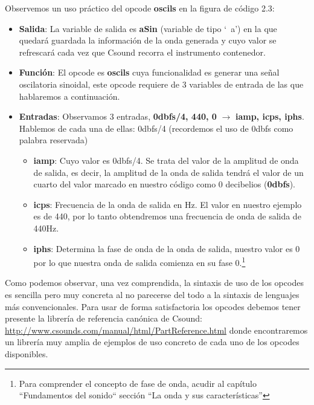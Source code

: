 
Observemos un uso práctico del opcode \textbf{oscils} en la figura de código 2.3:

\begin{itemize}
 \item \textbf{Salida}: La variable de salida es \textbf{aSin} (variable de tipo `\ a') en la que quedará guardada la información de la onda generada y cuyo valor se refrescará cada vez que Csound recorra el instrumento contenedor.
 
 \item \textbf{Función}: El opcode es \textbf{oscils} cuya funcionalidad es generar una señal oscilatoria sinoidal, este opcode requiere de 3 variables de entrada de las que hablaremos a continuación.
 
 \item \textbf{Entradas}: Observamos 3 entradas, \textbf{0dbfs/4, 440, 0} $\rightarrow$ \textbf{iamp, icps, iphs}. Hablemos  de cada una de ellas: 0dbfs/4 (recordemos el uso de 0dbfs como palabra reservada) 
 \begin{itemize}
 \item \textbf{iamp}: Cuyo valor es 0dbfs/4. Se trata del valor de la amplitud de onda de salida, es decir, la amplitud de la onda de salida tendrá el valor de un cuarto del valor marcado en nuestro código como 0 decibelios (\textbf{0dbfs}).
 
 \item \textbf{icps}: Frecuencia de la onda de salida en Hz. El valor en nuestro ejemplo es de 440, por lo tanto obtendremos una frecuencia de onda de salida de 440Hz.
 
 \item \textbf{iphs}: Determina la fase de onda de la onda de salida, nuestro valor es 0 por lo que nuestra onda de salida comienza en su fase 0.\footnote{Para comprender el concepto de fase de onda, acudir al capítulo ``Fundamentos del sonido`` sección ``La onda y sus características''}

 \end{itemize}

\end{itemize}

Como podemos observar, una vez comprendida, la sintaxis de uso de los opcodes es sencilla pero muy concreta al no parecerse del todo a la sintaxis de lenguajes más convencionales. Para usar de forma satisfactoria los opcodes debemos tener presente la librería de referencia canónica de Csound: \url{http://www.csounds.com/manual/html/PartReference.html} donde encontraremos un librería muy amplia de ejemplos de uso concreto de cada uno de los opcodes disponibles.

